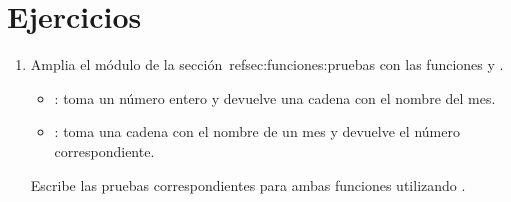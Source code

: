 \section{Ejercicios}

\begin{enumerate}

\item Amplia el módulo  de la sección~ref{sec:funciones:pruebas}
      con las funciones  y .
  \begin{itemize}
    \item {}: toma un número entero y
      devuelve una cadena con el nombre del mes. 
    \item {}: toma una cadena con el nombre
      de un mes y devuelve el número correspondiente.
  \end{itemize}

  Escribe las pruebas correspondientes para ambas funciones 
  utilizando .

\end{enumerate}
